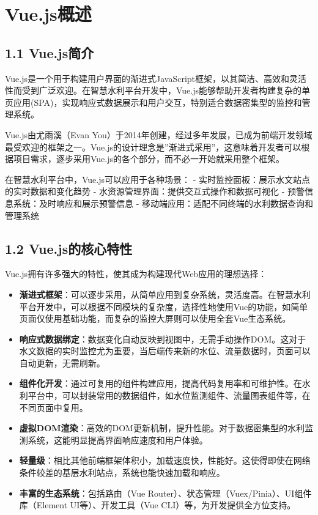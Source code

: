 \section{Vue.js概述}\label{vue.jsux6982ux8ff0}

\subsection{1.1 Vue.js简介}\label{vue.jsux7b80ux4ecb}

Vue.js是一个用于构建用户界面的渐进式JavaScript框架，以其简洁、高效和灵活性而受到广泛欢迎。在智慧水利平台开发中，Vue.js能够帮助开发者构建复杂的单页应用(SPA)，实现响应式数据展示和用户交互，特别适合数据密集型的监控和管理系统。

Vue.js由尤雨溪（Evan
You）于2014年创建，经过多年发展，已成为前端开发领域最受欢迎的框架之一。Vue.js的设计理念是''渐进式采用''，这意味着开发者可以根据项目需求，逐步采用Vue.js的各个部分，而不必一开始就采用整个框架。

在智慧水利平台中，Vue.js可以应用于各种场景： -
实时监控面板：展示水文站点的实时数据和变化趋势 -
水资源管理界面：提供交互式操作和数据可视化 -
预警信息系统：及时响应和展示预警信息 -
移动端应用：适配不同终端的水利数据查询和管理系统

\subsection{1.2
Vue.js的核心特性}\label{vue.jsux7684ux6838ux5fc3ux7279ux6027}

Vue.js拥有许多强大的特性，使其成为构建现代Web应用的理想选择：

\begin{itemize}
\item
  \textbf{渐进式框架}：可以逐步采用，从简单应用到复杂系统，灵活度高。在智慧水利平台开发中，可以根据不同模块的复杂度，选择性地使用Vue的功能，如简单页面仅使用基础功能，而复杂的监控大屏则可以使用全套Vue生态系统。
\item
  \textbf{响应式数据绑定}：数据变化自动反映到视图中，无需手动操作DOM。这对于水文数据的实时监控尤为重要，当后端传来新的水位、流量数据时，页面可以自动更新，无需刷新。
\item
  \textbf{组件化开发}：通过可复用的组件构建应用，提高代码复用率和可维护性。在水利平台中，可以封装常用的数据组件，如水位监测组件、流量图表组件等，在不同页面中复用。
\item
  \textbf{虚拟DOM渲染}：高效的DOM更新机制，提升性能。对于数据密集型的水利监测系统，这能明显提高界面响应速度和用户体验。
\item
  \textbf{轻量级}：相比其他前端框架体积小，加载速度快，性能好。这使得即使在网络条件较差的基层水利站点，系统也能快速加载和响应。
\item
  \textbf{丰富的生态系统}：包括路由（Vue
  Router）、状态管理（Vuex/Pinia）、UI组件库（Element
  UI等）、开发工具（Vue CLI）等，为开发提供全方位支持。
\end{itemize}

